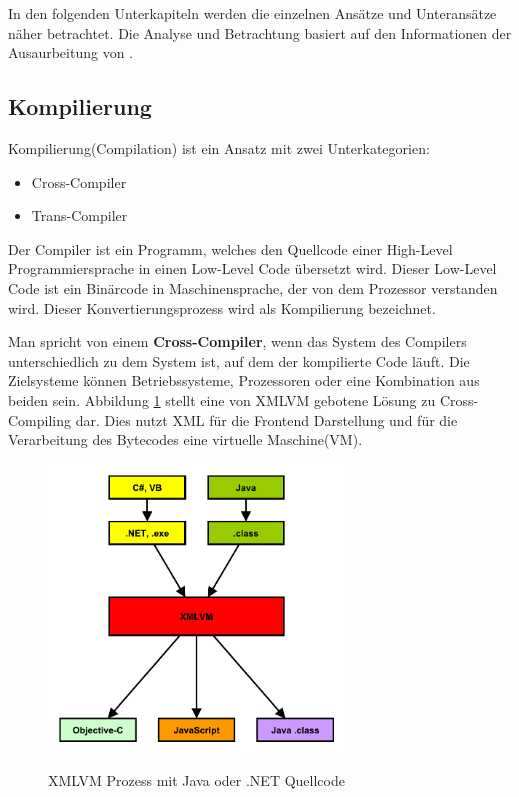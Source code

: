 In den folgenden Unterkapiteln werden die einzelnen Ansätze und Unteransätze näher betrachtet. Die Analyse und Betrachtung basiert auf den Informationen der Ausaurbeitung von \citep{cross_plattform_approaches}.

\subsection{Kompilierung}
Kompilierung(Compilation) ist ein Ansatz mit zwei Unterkategorien:

\begin{itemize}
	\item Cross-Compiler
	\item Trans-Compiler
\end{itemize}

Der Compiler ist ein Programm, welches den Quellcode einer High-Level Programmiersprache in einen Low-Level Code übersetzt wird. Dieser Low-Level Code ist ein Binärcode in Maschinensprache, der von dem Prozessor verstanden wird. Dieser Konvertierungsprozess wird als Kompilierung bezeichnet.

\bigskip
Man spricht von einem \textbf{Cross-Compiler}, wenn das System des Compilers unterschiedlich zu dem System ist, auf dem der kompilierte Code läuft. Die Zielsysteme können Betriebssysteme, Prozessoren oder eine Kombination aus beiden sein. Abbildung \ref{graph_compilation_XMLVM} stellt eine von XMLVM gebotene Lösung zu Cross-Compiling dar. Dies nutzt XML für die Frontend Darstellung und für die Verarbeitung des Bytecodes eine virtuelle Maschine(VM).

\begin{figure}[htbp]
	\centering
	\includegraphics[width=0.7\textwidth]{Bilder/Compilation_Cross_XMLVM}
	\caption{XMLVM Prozess mit Java oder .NET Quellcode}\label{graph_compilation_XMLVM}\citep{XMLVM_Toolchain}
\end{figure}

